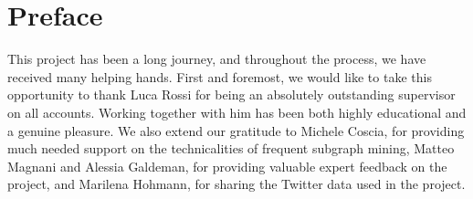 \chapter*{Preface}

This project has been a long journey, and throughout the process, we have received many helping hands. First and foremost, we would like to take this opportunity to thank Luca Rossi for being an absolutely outstanding supervisor on all accounts. Working together with him has been both highly educational and a genuine pleasure. We also extend our gratitude to Michele Coscia, for providing much needed support on the technicalities of frequent subgraph mining, Matteo Magnani and Alessia Galdeman, for providing valuable expert feedback on the project, and Marilena Hohmann, for sharing the Twitter data used in the project. 